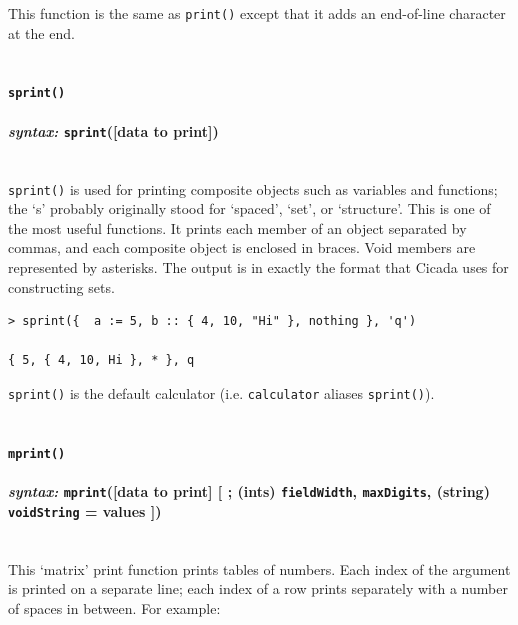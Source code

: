 \documentclass{article}
\newenvironment{code}{
       \begin{list}{}{
               \setlength{\leftmargin}{.4in}
               \setlength{\rightmargin}{0in}
               \setlength{\topsep}{.2in}
       }
       \small
       \item[] }
       { \end{list}   }
\begin{document}
This function is the same as \texttt{print()} except that it adds an end-of-line character at the end.\\\\


\paragraph{\texttt{sprint()}\\\\
\normalfont \emph{syntax: } \texttt{sprint}([data to print])\\\\}

\texttt{sprint()} is used for printing composite objects such as variables and functions;  the `s' probably originally stood for `spaced', `set', or `structure'.  This is one of the most useful functions.  It prints each member of an object separated by commas, and each composite object is enclosed in braces.  Void members are represented by asterisks.  The output is in exactly the format that Cicada uses for constructing sets.

\begin{code} \begin{verbatim}
> sprint({  a := 5, b :: { 4, 10, "Hi" }, nothing }, 'q')

{ 5, { 4, 10, Hi }, * }, q
\end{verbatim} \end{code}

\verb#sprint()# is the default calculator (i.e. \verb#calculator# aliases \verb#sprint()#).\\\\


\paragraph{\texttt{mprint()}\\\\
\normalfont \emph{syntax: } \texttt{mprint}([data to print] [ ; (ints) \texttt{fieldWidth}, \texttt{maxDigits}, (string) \texttt{voidString} = values ])\\\\}

This `matrix' print function prints tables of numbers.  Each index of the argument is printed on a separate line; each index of a row prints separately with a number of spaces in between.  For example:
\end{document}
